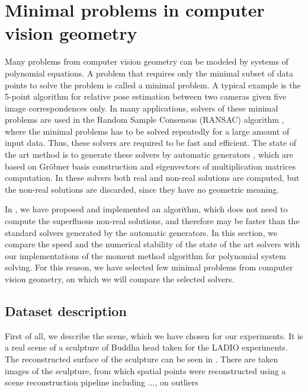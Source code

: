 \chapter{Minimal problems in computer vision geometry}
Many problems from computer vision geometry can be modeled by systems of polynomial equations.
A problem that requires only the minimal subset of data points to solve the problem is called a minimal problem.
A typical example is the 5-point algorithm \cite{5pt} for relative pose estimation between two cameras given five image correspondences only.
In many applications, solvers of these minimal problems are used in the Random Sample Consensus (RANSAC) algorithm \cite{ransac}, where the minimal problems has to be solved repeatedly for a large amount of input data.
Thus, these solvers are required to be fast and efficient.
The state of the art method is to generate these solvers by automatic generators \cite{autogen}, which are based on Gr\"obner basis construction and eigenvectors of multiplication matrices computation.
In these solvers both real and non-real solutions are computed, but the non-real solutions are discarded, since they have no geometric meaning.

In , we have proposed and implemented an algorithm, which does not need to compute the superfluous non-real solutions, and therefore may be faster than the standard solvers generated by the automatic generators.
In this section, we compare the speed and the numerical stability of the state of the art solvers with our implementations of the moment method algorithm for polynomial system solving.
For this reason, we have selected few minimal problems from computer vision geometry, on which we will compare the selected solvers.

\section{Dataset description}

First of all, we describe the scene, which we have chosen for our experiments.
It is a real scene of a sculpture of Buddha head taken for the LADIO \cite{ladio} experiments.
The reconstructed surface of the sculpture can be seen in .
There are \importAppLADIONumCameras{} taken images of the sculpture, from which \importAppLADIONumPoints{} spatial points were reconstructed using a scene reconstruction pipeline including ..., on outliers


